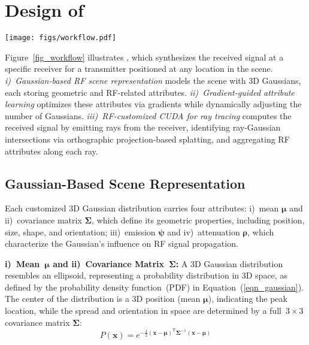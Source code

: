 \section{Design of \ourSystem}\label{sec_design}

\begin{figure*}[t]
\centering
{\texttt{[image: figs/workflow.pdf]}}
\caption{Illustration of the \ourSystem architecture, trained end-to-end, consisting of three main building blocks.}
  \Description[]{}
	\label{fig_workflow}
  \vspace{-10pt}
\end{figure*}



Figure~\ref{fig_workflow} illustrates \ourSystem, which synthesizes the received signal at a specific receiver for a transmitter positioned at any location in the scene. 
\textit{i)~Gaussian-based RF scene representation} models the scene with 3D Gaussians, each storing geometric and RF-related attributes.  
\textit{ii)~Gradient-guided attribute learning} optimizes these attributes via gradients while dynamically adjusting the number of Gaussians.  
\textit{iii)~RF-customized CUDA for ray tracing} computes the received signal by emitting rays from the receiver, identifying ray-Gaussian intersections via orthographic projection-based splatting, and aggregating RF attributes along each ray.


\subsection{Gaussian-Based Scene Representation}

Each customized 3D Gaussian distribution carries four attributes:  
i)~mean \(\boldsymbol{\mu}\) and ii)~covariance matrix \(\boldsymbol{\Sigma}\), which define its geometric properties, including position, size, shape, and orientation;
iii)~emission \(\boldsymbol{\psi}\) and iv)~attenuation \(\boldsymbol{\rho}\), which characterize the Gaussian's influence on RF signal propagation.


\textbf{i)~Mean~\(\boldsymbol{\mu}\) and ii)~Covariance Matrix~\(\boldsymbol{\Sigma}\):}  
A 3D Gaussian  distribution resembles an ellipsoid, representing a probability distribution in 3D space, as defined by the probability density function~(PDF) in Equation~(\ref{eqn_gaussian}).
The center of the distribution is a 3D position (mean \(\boldsymbol{\mu}\)), indicating the peak location, while the spread and orientation in space are determined by a full~\(3 \times 3\) covariance matrix \(\boldsymbol{\Sigma}\):
\begin{equation}
\label{eqn_gaussian}
    P\left(\mathbf{x}\right) = e^{-\frac{1}{2} \left(\mathbf{x} - \boldsymbol{\mu}\right)^\text{T} \boldsymbol{\Sigma}^{-1} \left(\mathbf{x} - \boldsymbol{\mu}\right)}
\end{equation}






